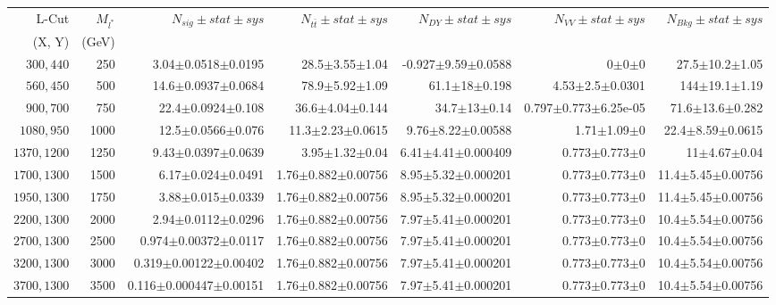 \documentclass[]{article}
\begin{document}
\begin{table}
\begin{center}
\scriptsize{
\begin{tabular}{ |r|r|r|r|r|r|r|}
\hline 
L-Cut & $M_{l^*}$ & $N_{sig}\pm stat \pm sys $ &$N_{t\bar{t}}\pm stat \pm sys $ & $N_{DY}\pm stat \pm sys $ & $N_{VV}\pm stat \pm sys $ &$N_{Bkg}\pm stat \pm sys$\\
(X, Y) & (GeV) & && &&\\
\hline 
$300, 440$ & 250 & 3.04$\pm$0.0518$\pm$0.0195 & 28.5$\pm$3.55$\pm$1.04 & -0.927$\pm$9.59$\pm$0.0588 & 0$\pm$0$\pm$0 & 27.5$\pm$10.2$\pm$1.05 \\
$560, 450$ & 500 & 14.6$\pm$0.0937$\pm$0.0684 & 78.9$\pm$5.92$\pm$1.09 & 61.1$\pm$18$\pm$0.198 & 4.53$\pm$2.5$\pm$0.0301 & 144$\pm$19.1$\pm$1.19 \\
$900, 700$ & 750 & 22.4$\pm$0.0924$\pm$0.108 & 36.6$\pm$4.04$\pm$0.144 & 34.7$\pm$13$\pm$0.14 & 0.797$\pm$0.773$\pm$6.25e-05 & 71.6$\pm$13.6$\pm$0.282 \\
$1080,950$ & 1000 & 12.5$\pm$0.0566$\pm$0.076 & 11.3$\pm$2.23$\pm$0.0615 & 9.76$\pm$8.22$\pm$0.00588 & 1.71$\pm$1.09$\pm$0 & 22.4$\pm$8.59$\pm$0.0615 \\
$1370,1200$ & 1250 & 9.43$\pm$0.0397$\pm$0.0639 & 3.95$\pm$1.32$\pm$0.04 & 6.41$\pm$4.41$\pm$0.000409 & 0.773$\pm$0.773$\pm$0 & 11$\pm$4.67$\pm$0.04 \\
$1700,1300$ & 1500 & 6.17$\pm$0.024$\pm$0.0491 & 1.76$\pm$0.882$\pm$0.00756 & 8.95$\pm$5.32$\pm$0.000201 & 0.773$\pm$0.773$\pm$0 & 11.4$\pm$5.45$\pm$0.00756 \\
$1950,1300$ & 1750 & 3.88$\pm$0.015$\pm$0.0339 & 1.76$\pm$0.882$\pm$0.00756 & 8.95$\pm$5.32$\pm$0.000201 & 0.773$\pm$0.773$\pm$0 & 11.4$\pm$5.45$\pm$0.00756 \\
$2200,1300$ & 2000 & 2.94$\pm$0.0112$\pm$0.0296 & 1.76$\pm$0.882$\pm$0.00756 & 7.97$\pm$5.41$\pm$0.000201 & 0.773$\pm$0.773$\pm$0 & 10.4$\pm$5.54$\pm$0.00756 \\
$2700,1300$ & 2500 & 0.974$\pm$0.00372$\pm$0.0117 & 1.76$\pm$0.882$\pm$0.00756 & 7.97$\pm$5.41$\pm$0.000201 & 0.773$\pm$0.773$\pm$0 & 10.4$\pm$5.54$\pm$0.00756 \\
$3200,1300$ & 3000 & 0.319$\pm$0.00122$\pm$0.00402 & 1.76$\pm$0.882$\pm$0.00756 & 7.97$\pm$5.41$\pm$0.000201 & 0.773$\pm$0.773$\pm$0 & 10.4$\pm$5.54$\pm$0.00756 \\
$3700,1300$ & 3500 & 0.116$\pm$0.000447$\pm$0.00151 & 1.76$\pm$0.882$\pm$0.00756 & 7.97$\pm$5.41$\pm$0.000201 & 0.773$\pm$0.773$\pm$0 & 10.4$\pm$5.54$\pm$0.00756 \\

\end{tabular}}
\end{center}
\end{table}
\end{document}
